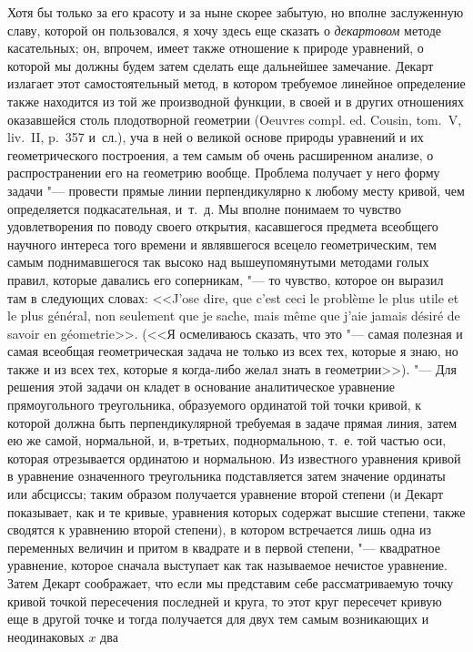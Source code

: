 Хотя бы только за его красоту и за ныне скорее забытую, но вполне заслуженную
славу, которой он пользовался, я хочу здесь еще сказать о {\em декартовом}
методе касательных; он, впрочем, имеет также отношение к природе уравнений, о
которой мы должны будем затем сделать еще дальнейшее замечание. Декарт излагает
этот самостоятельный метод, в котором требуемое линейное определение также
находится из той же производной функции, в своей и в других отношениях
оказавшейся столь плодотворной геометрии (Oeuvres compl. ed. Cousin, tom.~V,
liv.~II, p.~357 и~сл.), уча в ней о великой основе природы уравнений и их
геометрического построения, а тем самым об очень расширенном анализе, о
распространении его на геометрию вообще. Проблема получает у него форму задачи
"--- провести прямые линии перпендикулярно к любому месту кривой, чем
определяется подкасательная, и~т.~д. Мы вполне понимаем то чувство
удовлетворения по поводу своего открытия, касавшегося предмета всеобщего
научного интереса того времени и являвшегося всецело геометрическим, тем самым
поднимавшегося так высоко над вышеупомянутыми методами голых правил, которые
давались его соперникам, "--- то чувство, которое он выразил там в следующих
словах: <<J’ose dire, que c’est ceci le problème le plus utile et le plus
général, non seulement que je sache, mais même que j’aie jamais désiré de
savoir en géometrie>>. (<<Я осмеливаюсь сказать, что это "--- самая полезная и
самая всеобщая геометрическая задача не только из всех тех, которые я знаю, но
также и из всех тех, которые я когда-либо желал знать в геометрии>>). "--- Для
решения этой задачи он кладет в основание аналитическое уравнение
прямоугольного треугольника, образуемого ординатой той точки кривой, к которой
должна быть перпендикулярной требуемая в задаче прямая линия, затем ею же
самой, нормальной, и, в-третьих, поднормальною, т.~е. той частью оси, которая
отрезывается ординатою и нормальною. Из известного уравнения кривой в уравнение
означенного треугольника подставляется затем значение ординаты или абсциссы;
таким образом получается уравнение второй степени (и Декарт показывает, как и
те кривые, уравнения которых содержат высшие степени, также сводятся к
уравнению второй степени), в котором встречается лишь одна из переменных
величин и притом в квадрате и в первой степени, "--- квадратное уравнение,
которое сначала выступает как так называемое нечистое уравнение. Затем Декарт
соображает, что если мы представим себе рассматриваемую точку кривой точкой
пересечения последней и круга, то этот круг пересечет кривую еще в другой точке
и тогда получается для двух тем самым возникающих и неодинаковых $x$ два
